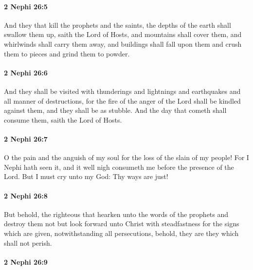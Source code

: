 		\paragraph{2 Nephi 26:5} %
			\label{2NEPHI-26-5}

			And they that kill the prophets and the saints,
			the depths of the earth shall swallow them up, saith the Lord of Hosts,
			and mountains shall cover them,
			and whirlwinds shall carry them away,
			and buildings shall fall upon them
			and crush them to pieces and grind them to powder.

		\paragraph{2 Nephi 26:6} %
			\label{2NEPHI-26-6}

			And they shall be visited with thunderings and lightnings
			and earthquakes and all manner of destructions,
			for the fire of the anger of the Lord shall be kindled against them,
			and they shall be as stubble.
			And the day that cometh shall consume them, saith the Lord of Hosts.

		\paragraph{2 Nephi 26:7} %
			\label{2NEPHI-26-7}

			O the pain and the anguish of my soul for the loss of the slain of my people!
			For I Nephi hath seen it,
			and it well nigh consumeth me before the presence of the Lord.
			But I must cry unto my God:
			Thy ways are just!

		\paragraph{2 Nephi 26:8} %
			\label{2NEPHI-26-8}

			But behold, the righteous that hearken unto the words of the prophets
			and destroy them not but look forward unto Christ
			with steadfastness for the signs which are given,
			notwithstanding all persecutions,
			behold, they are they which shall not perish.

		\paragraph{2 Nephi 26:9} %
			\label{2NEPHI-26-9}

